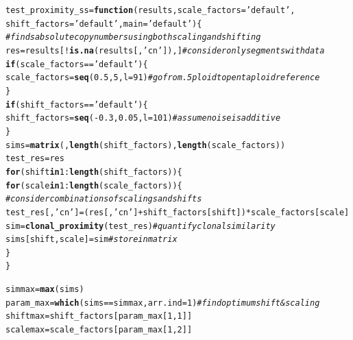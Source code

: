 \documentclass[12pt]{article}\usepackage[]{graphicx}\usepackage[]{color}
\makeatletter
\newcommand{\hlnum}[1]{\textcolor[rgb]{0.686,0.059,0.569}{#1}}%
\newcommand{\hlstr}[1]{\textcolor[rgb]{0.192,0.494,0.8}{#1}}%
\newcommand{\hlcom}[1]{\textcolor[rgb]{0.678,0.584,0.686}{\textit{#1}}}%
\newcommand{\hlopt}[1]{\textcolor[rgb]{0,0,0}{#1}}%
\newcommand{\hlstd}[1]{\textcolor[rgb]{0.345,0.345,0.345}{#1}}%
\newcommand{\hlkwa}[1]{\textcolor[rgb]{0.161,0.373,0.58}{\textbf{#1}}}%
\newcommand{\hlkwb}[1]{\textcolor[rgb]{0.69,0.353,0.396}{#1}}%
\newcommand{\hlkwc}[1]{\textcolor[rgb]{0.333,0.667,0.333}{#1}}%
\newcommand{\hlkwd}[1]{\textcolor[rgb]{0.737,0.353,0.396}{\textbf{#1}}}%
\newenvironment{kframe}{%
 \def\at@end@of@kframe{}%
 \ifinner\ifhmode%
  \def\at@end@of@kframe{\end{minipage}}%
  \begin{minipage}{\columnwidth}%
 \fi\fi%
 \def\FrameCommand##1{\hskip\@totalleftmargin \hskip-\fboxsep
 \colorbox{shadecolor}{##1}\hskip-\fboxsep
     \hskip-\linewidth \hskip-\@totalleftmargin \hskip\columnwidth}%
 \MakeFramed {\advance\hsize-\width
   \@totalleftmargin\z@ \linewidth\hsize
   \@setminipage}}%
 {\par\unskip\endMakeFramed%
 \at@end@of@kframe}
\newenvironment{knitrout}{}{} %
\makeatother
\begin{document}
\begin{knitrout}
\begin{kframe}
\begin{alltt}
\hlstd{test_proximity_ss} \hlkwb{=} \hlkwa{function}\hlstd{(} \hlkwc{results}\hlstd{,} \hlkwc{scale_factors} \hlstd{=} \hlstr{'default'}\hlstd{,}
                              \hlkwc{shift_factors} \hlstd{=} \hlstr{'default'}\hlstd{,} \hlkwc{main}\hlstd{=}\hlstr{'default'} \hlstd{)\{}
  \hlcom{#finds absolute copy numbers using both scaling and shifting}
  \hlstd{res} \hlkwb{=} \hlstd{results[} \hlopt{!}\hlkwd{is.na}\hlstd{(results[,}\hlstr{'cn'}\hlstd{]), ]} \hlcom{#consider only segments with data}
  \hlkwa{if} \hlstd{(scale_factors} \hlopt{==} \hlstr{'default'}\hlstd{)\{}
    \hlstd{scale_factors} \hlkwb{=} \hlkwd{seq}\hlstd{(} \hlnum{0.5}\hlstd{,} \hlnum{5}\hlstd{,} \hlkwc{l}\hlstd{=}\hlnum{91} \hlstd{)} \hlcom{#go from .5ploid to pentaploid reference}
  \hlstd{\}}
  \hlkwa{if} \hlstd{(shift_factors} \hlopt{==} \hlstr{'default'}\hlstd{)\{}
    \hlstd{shift_factors} \hlkwb{=} \hlkwd{seq}\hlstd{(} \hlopt{-}\hlnum{0.3}\hlstd{,}\hlnum{0.05}\hlstd{,} \hlkwc{l}\hlstd{=}\hlnum{101}\hlstd{)} \hlcom{#assume noise is additive}
  \hlstd{\}}
  \hlstd{sims} \hlkwb{=} \hlkwd{matrix}\hlstd{(,}\hlkwd{length}\hlstd{(shift_factors),} \hlkwd{length}\hlstd{(scale_factors))}
  \hlstd{test_res}\hlkwb{=}\hlstd{res}
  \hlkwa{for} \hlstd{(shift} \hlkwa{in} \hlnum{1}\hlopt{:}\hlkwd{length}\hlstd{(shift_factors))\{}
    \hlkwa{for} \hlstd{(scale} \hlkwa{in} \hlnum{1}\hlopt{:}\hlkwd{length}\hlstd{(scale_factors))\{}
      \hlcom{#consider combinations of scalings and shifts}
      \hlstd{test_res[,}\hlstr{'cn'}\hlstd{]} \hlkwb{=} \hlstd{(res[,}\hlstr{'cn'}\hlstd{]}\hlopt{+}\hlstd{shift_factors[shift])}\hlopt{*}\hlstd{scale_factors[scale]}
      \hlstd{sim} \hlkwb{=} \hlkwd{clonal_proximity}\hlstd{(test_res)} \hlcom{#quantify clonal similarity}
      \hlstd{sims[shift,scale]} \hlkwb{=} \hlstd{sim} \hlcom{#store in matrix}
    \hlstd{\}}
  \hlstd{\}}

  \hlstd{simmax} \hlkwb{=} \hlkwd{max}\hlstd{(sims)}
  \hlstd{param_max} \hlkwb{=} \hlkwd{which}\hlstd{(sims}\hlopt{==}\hlstd{simmax,} \hlkwc{arr.ind}\hlstd{=}\hlnum{1}\hlstd{)} \hlcom{#find optimum shift & scaling}
  \hlstd{shiftmax} \hlkwb{=} \hlstd{shift_factors[param_max[}\hlnum{1}\hlstd{,}\hlnum{1}\hlstd{]]}
  \hlstd{scalemax} \hlkwb{=} \hlstd{scale_factors[param_max[}\hlnum{1}\hlstd{,}\hlnum{2}\hlstd{]]}


\end{alltt}
\end{kframe}
\end{knitrout}
\end{document}
